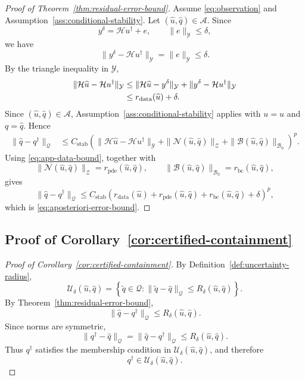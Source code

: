 \documentclass{article}
\numberwithin{equation}{section}
\theoremstyle{definition}
\begin{document}
\begin{proof}[Proof of Theorem~\ref{thm:residual-error-bound}]
Assume \eqref{eq:observation} and Assumption~\ref{ass:conditional-stability}. Let \((\widehat u,\widehat q)\in\mathcal A\). Since
\[
y^\delta=\mathcal H u^\dagger+e,
\qquad
\|e\|_{\mathcal Y}\le \delta,
\]
we have
\[
\|y^\delta-\mathcal H u^\dagger\|_{\mathcal Y}
=
\|e\|_{\mathcal Y}
\le
\delta.
\]
By the triangle inequality in \(\mathcal Y\),
\begin{align}
\|\mathcal H\widehat u-\mathcal H u^\dagger\|_{\mathcal Y}
&\le
\|\mathcal H\widehat u-y^\delta\|_{\mathcal Y}
+
\|y^\delta-\mathcal H u^\dagger\|_{\mathcal Y} \notag\\
&\le
r_{\mathrm{data}}(\widehat u)+\delta .
\label{eq:app-data-bound}
\end{align}
Since \((\widehat u,\widehat q)\in\mathcal A\), Assumption~\ref{ass:conditional-stability} applies with \(u=\widehat u\) and \(q=\widehat q\). Hence
\begin{align}
\|\widehat q-q^\dagger\|_{\mathcal Q}
&\le
C_{\mathrm{stab}}
\left(
\|\mathcal H\widehat u-\mathcal H u^\dagger\|_{\mathcal Y}
+
\|\mathcal N(\widehat u,\widehat q)\|_{\mathcal Z}
+
\|\mathcal B(\widehat u,\widehat q)\|_{\mathcal B_0}
\right)^p .
\end{align}
Using \eqref{eq:app-data-bound}, together with
\[
\|\mathcal N(\widehat u,\widehat q)\|_{\mathcal Z}
=
r_{\mathrm{pde}}(\widehat u,\widehat q),
\qquad
\|\mathcal B(\widehat u,\widehat q)\|_{\mathcal B_0}
=
r_{\mathrm{bc}}(\widehat u,\widehat q),
\]
gives
\[
\|\widehat q-q^\dagger\|_{\mathcal Q}
\le
C_{\mathrm{stab}}
\left(
r_{\mathrm{data}}(\widehat u)
+
r_{\mathrm{pde}}(\widehat u,\widehat q)
+
r_{\mathrm{bc}}(\widehat u,\widehat q)
+
\delta
\right)^p ,
\]
which is \eqref{eq:aposteriori-error-bound}.
\end{proof}

\subsection{Proof of Corollary~\ref{cor:certified-containment}}

\begin{proof}[Proof of Corollary~\ref{cor:certified-containment}]
By Definition~\ref{def:uncertainty-radius},
\[
\mathcal U_\delta(\widehat u,\widehat q)
=
\left\{
\widetilde q\in\mathcal Q:
\|\widetilde q-\widehat q\|_{\mathcal Q}
\le
R_\delta(\widehat u,\widehat q)
\right\}.
\]
By Theorem~\ref{thm:residual-error-bound},
\[
\|\widehat q-q^\dagger\|_{\mathcal Q}
\le
R_\delta(\widehat u,\widehat q).
\]
Since norms are symmetric,
\[
\|q^\dagger-\widehat q\|_{\mathcal Q}
=
\|\widehat q-q^\dagger\|_{\mathcal Q}
\le
R_\delta(\widehat u,\widehat q).
\]
Thus \(q^\dagger\) satisfies the membership condition in \(\mathcal U_\delta(\widehat u,\widehat q)\), and therefore
\[
q^\dagger\in\mathcal U_\delta(\widehat u,\widehat q).
\]
\end{proof}
\end{document}
